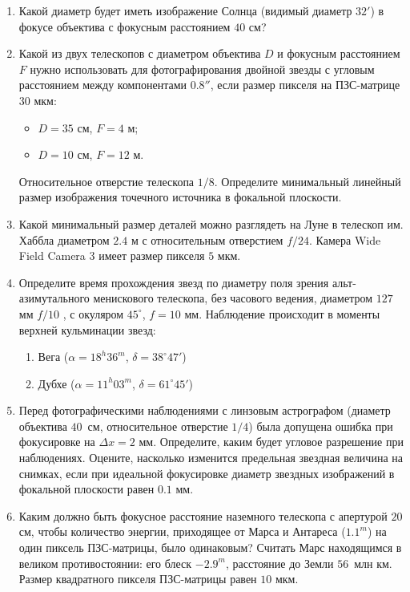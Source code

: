 \documentclass[12pt]{article}
\begin{document}
\begin{enumerate}
    \item Какой диаметр будет иметь изображение Солнца (видимый диаметр $32'$) в фокусе объектива с фокусным расстоянием $40$ см?
    \item Какой из двух телескопов с диаметром объектива $D$ и фокусным расстоянием $F$ нужно использовать для фотографирования двойной звезды с угловым расстоянием между компонентами $0.8''$, если размер пикселя на ПЗС-матрице $30$ мкм:
	\begin{itemize}
		\item $D = 35$ см, $F = 4$ м;
		\item $D = 10$ см, $F = 12$ м.
	\end{itemize}
    Относительное отверстие телескопа $1/8$. Определите минимальный линейный размер изображения точечного источника в фокальной плоскости.
    \item Какой минимальный размер деталей можно разглядеть на Луне в телескоп им. Хаббла диаметром $2.4$ м с относительным отверстием $f/24$. Камера Wide Field Camera $3$ имеет размер пикселя $5$ мкм.
    \item Определите время прохождения звезд по диаметру поля зрения альт-азимутального менискового телескопа, без часового ведения, диаметром $127$ мм $f/10$ , с окуляром $45^{\circ}$, $f=10$ мм. Наблюдение происходит в моменты верхней кульминации звезд:
	\begin{enumerate}
		\item	Вега  ($\alpha= 18^h 36^m$, $\delta=38^{\circ}47'$)
		\item	Дубхе ($\alpha= 11^h 03^m$, $\delta=61^{\circ}45'$)
	\end{enumerate}
    \item Перед фотографическими наблюдениями с линзовым астрографом (диаметр объектива $40$~см, относительное отверстие $1/4$) была допущена ошибка при фокусировке на $\Delta x=2$ мм. Определите, каким будет угловое разрешение при наблюдениях. Оцените, насколько изменится предельная звездная величина на снимках, если при идеальной фокусировке диаметр звездных изображений в фокальной плоскости равен $0.1$ мм.
    \item Каким должно быть фокусное расстояние наземного телескопа с апертурой $20$ см, чтобы количество энергии, приходящее от Марса и Антареса ($1.1^m$) на один пиксель ПЗС-матрицы, было одинаковым? Считать Марс находящимся в великом противостоянии: его блеск $-2.9^m$, расстояние до Земли $56$~млн км. Размер квадратного пикселя ПЗС-матрицы равен $10$ мкм.
\end{enumerate}
\end{document}
